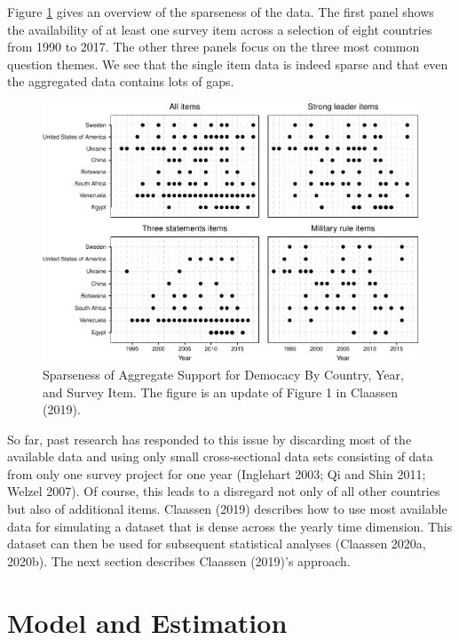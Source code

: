 \documentclass[12pt,english,a4paper,oneside]{article}
\theoremstyle{definition}
\theoremstyle{definition}
\theoremstyle{definition}
\theoremstyle{definition}
\theoremstyle{remark}
\begin{document}
Figure \ref{fig:sparse-data} gives an overview of the sparseness of the data. The first panel shows the availability of at least one survey item across a selection of eight countries from 1990 to 2017. The other three panels focus on the three most common question themes. We see that the single item data is indeed sparse and that even the aggregated data contains lots of gaps.

\begin{figure}[H]
\includegraphics[width=\textwidth]{figs/sparse-data-1} \caption[Sparseness of Aggregate Support for Democacy By Country, Year, and Survey Item]{Sparseness of Aggregate Support for Democacy By Country, Year, and Survey Item. The figure is an update of Figure 1 in Claassen (2019).}\label{fig:sparse-data}
\end{figure}

\noindent
So far, past research has responded to this issue by discarding most of the available data and using only small cross-sectional data sets consisting of data from only one survey project for one year (Inglehart 2003; Qi and Shin 2011; Welzel 2007). Of course, this leads to a disregard not only of all other countries but also of additional items. Claassen (2019) describes how to use most available data for simulating a dataset that is dense across the yearly time dimension. This dataset can then be used for subsequent statistical analyses (Claassen 2020a, 2020b). The next section describes Claassen (2019)'s approach.

\hypertarget{model-and-estimation}{%
\section{Model and Estimation}\label{model-and-estimation}}
\end{document}
